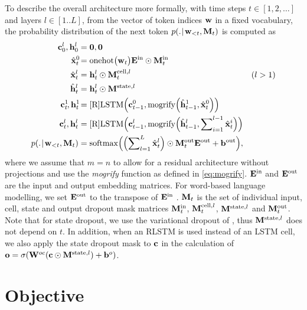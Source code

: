 To describe the overall architecture more formally, with time steps $t \in [1, 2, \dots]$ and layers $l \in [1..L]$, from the vector of token indices $\mathbf{w}$  in a fixed vocabulary, the probability distribution of the next token $p(.\hspace{0.08em}|\hspace{0.11em} \mathbf{w}_{<t},\mathbf{M}_t)$ is computed as
{\setlength{\jot}{0.6em}
\begin{align*}
\mathbf{c}^l_0, \mathbf{h}^l_0 &= \mathbf{0}, \mathbf{0}\\
\hat{\mathbf{x}}^0_t\! &= \operatorname*{onehot}\bigl(\mathbf{w}_t\bigr) \mathbf{E}^{\textrm{in}} \odot \mathbf{M}^\textrm{in}_t\\
\hat{\mathbf{x}}^l_t &= \mathbf{h}^l_t \odot \mathbf{M}^{\textrm{cell},l}_t & (l > 1) \\
\hat{\mathbf{h}}^l_t &= \mathbf{h}^l_t \odot \mathbf{M}^{\textrm{state},l}\\
\mathbf{c}^1_t\!, \mathbf{h}^1_t\! &= \textrm{[R]LSTM}\Bigl(\mathbf{c}^0_{t-1}, \operatorname*{mogrify}\Bigl(\hat{\mathbf{h}}^1_{t-1}, \hat{\mathbf{x}}^0_t\Bigr)\Bigr) \\
\mathbf{c}^l_t, \mathbf{h}^l_t &= \textrm{[R]LSTM}\Bigl(\mathbf{c}^l_{t-1}, \operatorname*{mogrify}\Bigl(\hat{\mathbf{h}}^l_{t-1}, \sum\nolimits_{i=1}^{l-1} \hat{\mathbf{x}}^i_t\Bigr)\Bigr) \\
p(.\hspace{0.08em}|\hspace{0.11em} \mathbf{w}_{<t},\mathbf{M}_t) &= \operatorname*{softmax}\Bigl(\Bigl(\sum\nolimits_{l=1}^L \hat{\mathbf{x}}^l_t\Bigr) \odot \mathbf{M}^{\textrm{out}}_t \mathbf{E}^{\textrm{out}} + \mathbf{b}^{\textrm{out}}\Bigr),
\end{align*}}%
where we assume that $m=n$ to allow for a residual architecture without projections and use the \emph{mogrify} function as defined in \eqref{eq:mogrify}.
$\mathbf{E}^{\textrm{in}}$ and $\mathbf{E}^{\textrm{out}}$ are the input and output embedding matrices.
For word-based language modelling, we set $\mathbf{E}^{\textrm{out}}$ to the transpose of $\mathbf{E}^{\textrm{in}}$ \citep{DBLP:journals/corr/ZophL16,DBLP:journals/corr/PressW16}.
$\mathbf{M}_t$ is the set of individual input, cell, state and output dropout mask matrices $\mathbf{M}^{\textrm{in}}_t$, $\mathbf{M}^{\textrm{cell},l}_t$, $\mathbf{M}^{\textrm{state},l}$ and $\mathbf{M}^{\textrm{out}}_t$.
Note that for state dropout, we use the variational dropout of \citet{gal2016theoretically}, thus $\mathbf{M}^{\textrm{state},l}$ does not depend on $t$.
In addition, when an RLSTM is used instead of an LSTM cell, we also apply the state dropout mask to $\mathbf{c}$ in the calculation of $\mathbf{o} = \sigma(\mathbf{W}^{oc} (\mathbf{c} \odot \mathbf{M}^{\textrm{state},l}) + \mathbf{b}^o)$.%


\section{Objective}

